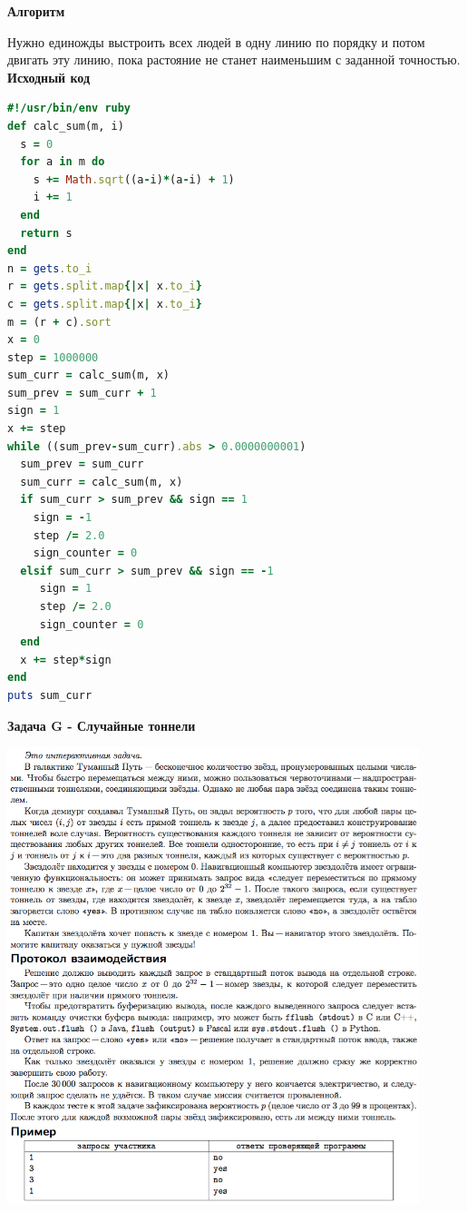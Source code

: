\documentclass[a4paper,12pt]{article}
\begin{document}
\textbf{{\large Алгоритм}}

Нужно единожды выстроить всех людей в одну линию по порядку и потом двигать эту линию, пока растояние не станет наименьшим с заданной точностью. \\

\newpage
\textbf{{\large Исходный код}} \\
\begin{lstlisting}[language=Ruby]
#!/usr/bin/env ruby
def calc_sum(m, i)
  s = 0
  for a in m do
    s += Math.sqrt((a-i)*(a-i) + 1)
    i += 1
  end
  return s
end
n = gets.to_i
r = gets.split.map{|x| x.to_i}
c = gets.split.map{|x| x.to_i}
m = (r + c).sort
x = 0
step = 1000000
sum_curr = calc_sum(m, x)
sum_prev = sum_curr + 1
sign = 1
x += step
while ((sum_prev-sum_curr).abs > 0.0000000001)
  sum_prev = sum_curr
  sum_curr = calc_sum(m, x)
  if sum_curr > sum_prev && sign == 1
    sign = -1
    step /= 2.0
    sign_counter = 0
  elsif sum_curr > sum_prev && sign == -1
     sign = 1
     step /= 2.0
     sign_counter = 0
  end
  x += step*sign
end
puts sum_curr

\end{lstlisting}

\newpage
\textbf{{\large Задача G - Случайные тоннели}}

\begin{center}
\includegraphics[width=0.9\textwidth]{OC_Peterhof/G.png}\\ [1cm]
\end{center}
\end{document}
